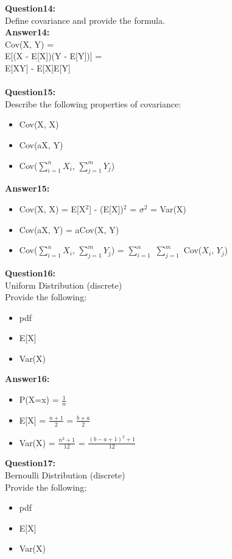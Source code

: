 \documentclass{article}
\begin{document}
\textbf{Question14:} \\
Define covariance and provide the formula.
\\
\textbf{Answer14:} \\
Cov(X, Y) = \\
E[(X - E[X])(Y - E[Y])] = \\
E[XY] - E[X]E[Y]
\\\\


\textbf{Question15:} \\
Describe the following properties of covariance:\\
\begin{itemize}
	\item Cov(X, X)
	\item Cov(aX, Y)
	\item Cov($\sum_{i=1}^n X_i$, $\sum_{j=1}^m Y_j$)
\end{itemize}

\textbf{Answer15:} \\
\begin{itemize}
	\item Cov(X, X) = E[X$^2$] - (E[X])$^2$ = $\sigma^2$ = Var(X)
	\item Cov(aX, Y) = aCov(X, Y)
	\item Cov($\sum_{i=1}^n X_i$, $\sum_{j=1}^m Y_j$) = $\sum_{i=1}^n$ $\sum_{j=1}^m$ Cov($X_i$, $Y_j$)
\end{itemize}


\textbf{Question16:} \\
Uniform Distribution (discrete)\\
Provide the following:
\begin{itemize}
	\item pdf
	\item E[X]
	\item Var(X)
\end{itemize}

\textbf{Answer16:} \\
\begin{itemize}
	\item P(X=x) = $\frac{1}{n}$
	\item E[X] = $\frac{n + 1}{2}$ = $\frac{b + a}{2}$
	\item Var(X) = $\frac{n^2 + 1}{12}$ = $\frac{(b - a + 1)^2 + 1}{12}$
\end{itemize}


\textbf{Question17:} \\
Bernoulli Distribution (discrete)\\
Provide the following:
\begin{itemize}
	\item pdf
	\item E[X]
	\item Var(X)
\end{itemize}
\end{document}
